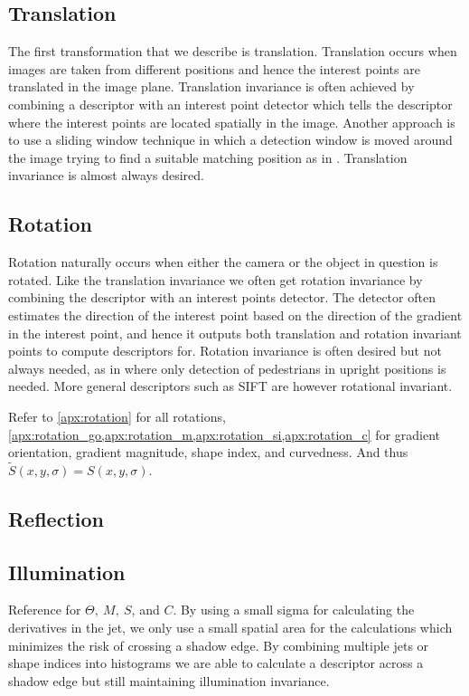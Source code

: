 \documentclass[thesis.tex]{subfiles}
\begin{document}
\subsection{Translation}
The first transformation that we describe is translation. Translation occurs when images are taken from different positions and hence the interest points are translated in the image plane. Translation invariance is often achieved by combining a descriptor with an interest point detector which tells the descriptor where the interest points are located spatially in the image. Another approach is to use a sliding window technique in which a detection window is moved around the image trying to find a suitable matching position as in \cite{felzenszwalb2008discriminatively}. Translation invariance is almost always desired.


\subsection{Rotation}
Rotation naturally occurs when either the camera or the object in question is rotated. Like the translation invariance we often get rotation invariance by combining the descriptor with an interest points detector. The detector often estimates the direction of the interest point based on the direction of the gradient in the interest point, and hence it outputs both translation and rotation invariant points to compute descriptors for. Rotation invariance is often desired but not always needed, as in \cite{dalal2005histograms,felzenszwalb2008discriminatively} where only detection of pedestrians in upright positions is needed. More general descriptors such as SIFT are however rotational invariant.

Refer to \cref{apx:rotation} for all rotations, \cref{apx:rotation_go,apx:rotation_m,apx:rotation_si,apx:rotation_c} for gradient orientation, gradient magnitude, shape index, and curvedness.
%
And thus $\widetilde{S}(x,y,\sigma) = S(x,y,\sigma)$.
%
\subsection{Reflection}

\subsection{Illumination}
Reference  for $\Theta,~M,~S$, and $C$.
By using a small sigma for calculating the derivatives in the jet, we only use a small spatial area for the calculations which minimizes the risk of crossing a shadow edge. By combining multiple jets or shape indices into histograms we are able to calculate a descriptor across a shadow edge but still maintaining illumination invariance.
\end{document}
